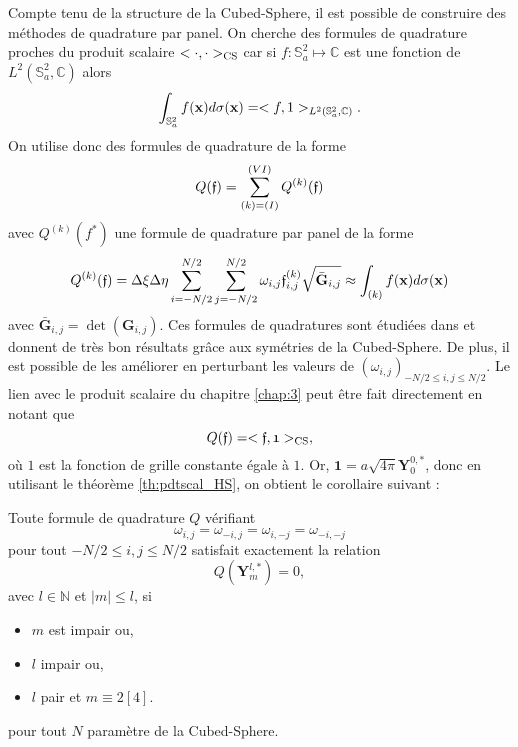 Compte tenu de la structure de la Cubed-Sphere, il est possible de construire des méthodes de quadrature par panel. On cherche des formules de quadrature proches du produit scalaire $< \cdot, \cdot >_{\text{CS}}$ car si $f : \mathbb{S}_a^2 \mapsto \mathbb{C}$ est une fonction de $L^2(\mathbb{S}_a^2, \mathbb{C})$ alors
\begin{equation}
\displaystyle\int_{\mathbb{S}_a^2} f(\mathbf{x}) d\sigma(\mathbf{x}) = <f,1>_{L^2(\mathbb{S}_a^2, \mathbb{C})}.
\end{equation}
On utilise donc des formules de quadrature de la forme
\begin{equation}
Q(\mathfrak{f}) = \displaystyle\sum\limits_{(k) = (I)}^{(VI)} Q^{(k)}(\mathfrak{f})
\end{equation}
avec $Q^{(k)}(f^*)$ une formule de quadrature par panel de la forme
\begin{equation}
Q^{(k)}(\mathfrak{f}) = \Delta \xi \Delta \eta \displaystyle\sum\limits_{i=-N/2}^{N/2} \displaystyle\sum\limits_{j=-N/2}^{N/2} \omega_{i,j} \mathfrak{f}_{i,j}^{(k)} \sqrt{\bar{\mathbf{G}}_{i,j}} \approx \displaystyle\int_{(k)} f(\mathbf{x}) d \sigma(\mathbf{x})
\end{equation}
avec $\bar{\mathbf{G}}_{i,j} = \det(\mathbf{G}_{i,j})$.
Ces formules de quadratures sont étudiées dans \cite{Portelenelle2018} et donnent de très bon résultats grâce aux symétries de la Cubed-Sphere. De plus, il est possible de les améliorer en perturbant les valeurs de $(\omega_{i,j})_{-N/2 \leq i,j \leq N/2}$. Le lien avec le produit scalaire du chapitre \ref{chap:3} peut être fait directement en notant que
\begin{equation}
Q(\mathfrak{f}) = <\mathfrak{f}, \mathfrak{1}>_{\text{CS}},
\end{equation}
où $\mathfrak{1}$ est la fonction de grille constante égale à $1$.
Or, $\mathbf{1} = a \sqrt{4 \pi} \mathbf{Y}_0^{0,*}$, donc en utilisant le théorème \ref{th:pdtscal_HS}, on obtient le corollaire suivant :
\begin{corollaire}
Toute formule de quadrature $Q$ vérifiant
\begin{equation}
\omega_{i,j} = \omega_{-i,j} = \omega_{i,-j} = \omega_{-i,-j}
\end{equation}
pour tout $-N/2 \leq i,j \leq N/2$ satisfait exactement la relation 
\begin{equation}
Q \left( \mathbf{Y}_m^{l,*} \right) = 0,
\end{equation}
avec $l \in \mathbb{N}$ et $|m| \leq l$, si
\begin{itemize}
\item $m$ est impair ou,
\item $l$ impair ou,
\item $l$ pair et $m \equiv 2 [4]$.
\end{itemize}
pour tout $N$ paramètre de la Cubed-Sphere.
\label{cor:quadrature_exacte}
\end{corollaire}

